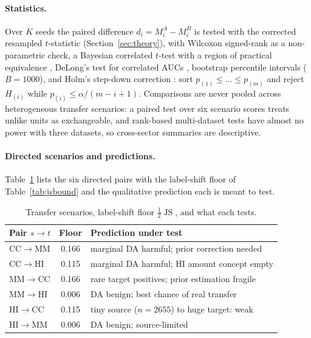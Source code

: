 \documentclass[journal]{IEEEtran}
\newcommand{\1}{\mathbf{1}}
\DeclareMathOperator{\JS}{JS}
\begin{document}
\paragraph{Statistics.} Over $K$ seeds the paired difference $d_i=M_i^A-M_i^B$ is tested with the corrected resampled $t$-statistic (Section~\ref{sec:theory}), with Wilcoxon signed-rank as a non-parametric check, a Bayesian correlated $t$-test with a region of practical equivalence \cite{benavoli2017time}, DeLong's test for correlated AUCs \cite{delong1988auc}, bootstrap percentile intervals ($B=1000$), and Holm's step-down correction \cite{holm1979simple}: sort $p_{(1)}\le\dots\le p_{(m)}$ and reject $H_{(i)}$ while $p_{(i)}\le\alpha/(m-i+1)$. Comparisons are never pooled across heterogeneous transfer scenarios: a paired test over six scenario scores treats unlike units as exchangeable, and rank-based multi-dataset tests \cite{demsar2006statistical} have almost no power with three datasets, so cross-sector summaries are descriptive.


\paragraph{Directed scenarios and predictions.} Table~\ref{tab:scen} lists the six directed pairs with the label-shift floor of Table~\ref{tab:jsbound} and the qualitative prediction each is meant to test.
\begin{table}[h]
\centering
\caption{Transfer scenarios, label-shift floor $\tfrac12\JS$, and what each tests.}
\label{tab:scen}
\scriptsize
\begin{tabular}{@{}lcp{4.6cm}@{}}
\toprule
Pair $s\to t$ & Floor & Prediction under test \\
\midrule
CC$\to$MM & 0.166 & marginal DA harmful; prior correction needed \\
CC$\to$HI & 0.115 & marginal DA harmful; HI amount concept empty \\
MM$\to$CC & 0.166 & rare target positives; prior estimation fragile \\
MM$\to$HI & 0.006 & DA benign; best chance of real transfer \\
HI$\to$CC & 0.115 & tiny source ($n{=}2655$) to huge target: weak \\
HI$\to$MM & 0.006 & DA benign; source-limited \\
\bottomrule
\end{tabular}
\end{table}
\end{document}
